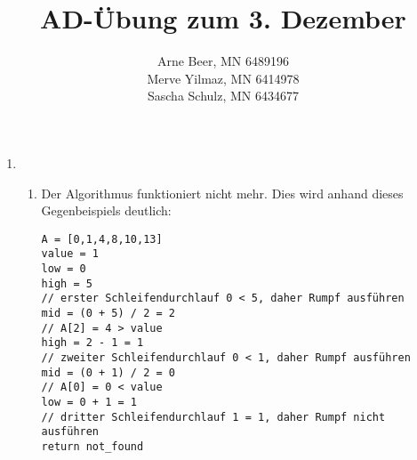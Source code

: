\documentclass{article}
\title{AD-Übung zum 3. Dezember}
\author{Arne Beer, MN 6489196\\
Merve Yilmaz, MN 6414978\\
Sascha Schulz, MN 6434677}
\begin{document}
\maketitle

\begin{enumerate}[\bfseries1.]
\item 
    \begin{enumerate}
        \item %
                Der Algorithmus funktioniert nicht mehr. Dies wird anhand dieses Gegenbeispiels deutlich:
                
\begin{verbatim}
A = [0,1,4,8,10,13]
value = 1
low = 0
high = 5
// erster Schleifendurchlauf 0 < 5, daher Rumpf ausführen
mid = (0 + 5) / 2 = 2
// A[2] = 4 > value
high = 2 - 1 = 1
// zweiter Schleifendurchlauf 0 < 1, daher Rumpf ausführen
mid = (0 + 1) / 2 = 0
// A[0] = 0 < value
low = 0 + 1 = 1
// dritter Schleifendurchlauf 1 = 1, daher Rumpf nicht ausführen
return not_found
\end{verbatim}
                

\end{enumerate}
\end{enumerate}
\end{document}
